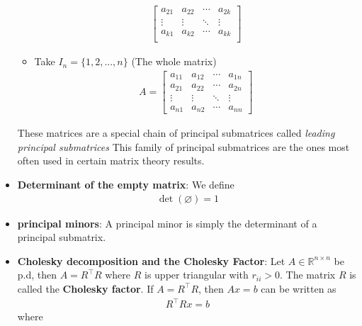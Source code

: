 \documentclass{report}
\begin{document}
\begin{itemize}
\begin{itemize}
\begin{align*}
\begin{bmatrix}
                            a_{21} & a_{22} & \cdots & a_{2k} \\
                            \vdots & \vdots & \ddots & \vdots \\
                            a_{k1} & a_{k2} & \cdots & a_{kk} \\
                        \end{bmatrix}
                    \end{align*}
                \item Take $I_{n} = \{1,2,...,n\} $ (The whole matrix)
                    \begin{align*}
                        A = \begin{bmatrix}
                            a_{11} & a_{12} & \cdots & a_{1n} \\
                            a_{21} & a_{22} & \cdots & a_{2n} \\
                            \vdots & \vdots & \ddots & \vdots \\
                            a_{n1} & a_{n2} & \cdots & a_{nn} 
                        \end{bmatrix}
                    \end{align*}
            \end{itemize}
            \bigbreak \noindent 
            These matrices are a special chain of principal submatrices called \textit{leading principal submatrices}
            \bigbreak \noindent 
            This family of principal submatrices are the ones most often used in certain matrix theory results.
        \item \textbf{Determinant of the empty matrix}: We define
            \begin{align*}
                \det(\varnothing) = 1
            \end{align*}
        \item \textbf{principal minors}: A principal minor is simply the determinant of a principal submatrix.
        \item \textbf{Cholesky decomposition and the Cholesky Factor}: Let $A \in \mathbb{R}^{n\times n}$ be p.d, then $A = R^{\top}R$ where $R$ is upper triangular with $r_{ii} > 0$. The matrix $R$ is called the \textbf{Cholesky factor}.
            \bigbreak \noindent 
            If $A = R^{\top}R$, then $Ax = b$ can be written as 
            \begin{align*}
                R^{\top}Rx = b
            \end{align*}
            where

\end{itemize}
\end{document}
